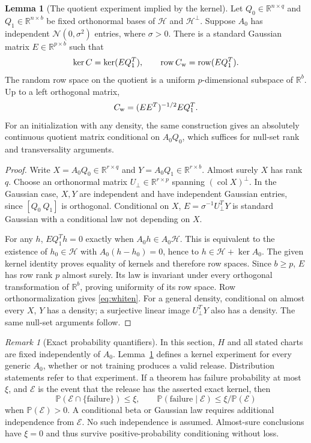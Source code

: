 \documentclass[11pt,a4paper]{article}
\theoremstyle{definition}
\newtheorem{lemma}[theorem]{Lemma}
\theoremstyle{definition}
\theoremstyle{remark}\newtheorem{remark}[theorem]{Remark}
\newcommand{\R}{\mathbb R}\newcommand{\Prob}{\mathbb P}\newcommand{\E}{\mathbb E}
\newcommand{\HH}{\mathcal H}\newcommand{\XX}{\mathcal X}\newcommand{\col}{\operatorname{col}}
\newcommand{\row}{\operatorname{row}}\newcommand{\rank}{\operatorname{rank}}
\begin{document}
\begin{lemma}[The quotient experiment implied by the kernel]\label{lem:quotient}
Let $Q_0\in\R^{n\times q}$ and $Q_1\in\R^{n\times b}$ be fixed orthonormal bases of $\HH$ and $\HH^\perp$. Suppose $A_0$ has independent $\mathcal N(0,\sigma^2)$ entries, where $\sigma>0$. There is a standard Gaussian matrix $E\in\R^{p\times b}$ such that
\[
\ker C=\ker(EQ_1^T),\qquad
\row C_{\rm w}=\row(EQ_1^T).
\]
The random row space on the quotient is a uniform $p$-dimensional subspace of $\R^b$. Up to a left orthogonal matrix,
\begin{equation}\label{eq:whiten}
C_{\rm w}=(EE^T)^{-1/2}E Q_1^T.
\end{equation}
For an initialization with any density, the same construction gives an absolutely continuous quotient matrix conditional on $A_0Q_0$, which suffices for null-set rank and transversality arguments.
\end{lemma}
\begin{proof}
Write $X=A_0Q_0\in\R^{r\times q}$ and $Y=A_0Q_1\in\R^{r\times b}$. Almost surely $X$ has rank $q$. Choose an orthonormal matrix $U_\perp\in\R^{r\times p}$ spanning $(\col X)^\perp$. In the Gaussian case, $X,Y$ are independent and have independent Gaussian entries, since $[Q_0\ Q_1]$ is orthogonal. Conditional on $X$, $E=\sigma^{-1}U_\perp^TY$ is standard Gaussian with a conditional law not depending on $X$.

For any $h$, $EQ_1^Th=0$ exactly when $A_0h\in A_0\HH$. This is equivalent to the existence of $h_0\in\HH$ with $A_0(h-h_0)=0$, hence to $h\in\HH+\ker A_0$. The given kernel identity proves equality of kernels and therefore row spaces. Since $b\ge p$, $E$ has row rank $p$ almost surely. Its law is invariant under every orthogonal transformation of $\R^b$, proving uniformity of its row space. Row orthonormalization gives \eqref{eq:whiten}. For a general density, conditional on almost every $X$, $Y$ has a density; a surjective linear image $U_\perp^TY$ also has a density. The same null-set arguments follow.
\end{proof}

\begin{remark}[Exact probability quantifiers]\label{rem:prob}
In this section, $H$ and all stated charts are fixed independently of $A_0$. Lemma~\ref{lem:quotient} defines a kernel experiment for every generic $A_0$, whether or not training produces a valid release. Distribution statements refer to that experiment. If a theorem has failure probability at most $\xi$, and $\mathcal E$ is the event that the release has the asserted exact kernel, then
\[
\Prob(\mathcal E\cap\{\text{failure}\})\le\xi,
\qquad
\Prob(\text{failure}\mid\mathcal E)\le\xi/\Prob(\mathcal E)
\]
when $\Prob(\mathcal E)>0$. A conditional beta or Gaussian law requires additional independence from $\mathcal E$. No such independence is assumed. Almost-sure conclusions have $\xi=0$ and thus survive positive-probability conditioning without loss.
\end{remark}
\end{document}

